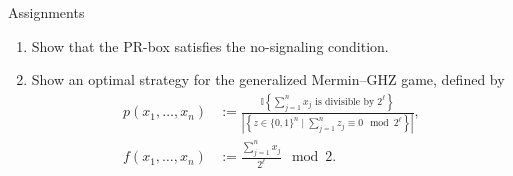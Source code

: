 \documentclass{beamer}
\begin{document}
\begin{frame}{Assignments}
\begin{enumerate}
\setlength{\itemsep}{2em}
\item Show that the PR-box satisfies the no-signaling condition.
\item Show an optimal strategy for the generalized Mermin--GHZ game, defined by
\small
\begin{align*}
p(x_1,\dotsc,x_n) &:= \frac{\mathbb{I}\left\{\sum_{j=1}^n x_j\text{ is divisible by } 2^\ell\right\}}{\left|\left\{z\in\{0,1\}^n\mid \sum_{j=1}^n z_j \equiv 0 \mod 2^\ell\right\}\right|},\\
f(x_1,\dotsc,x_n) &:= \frac{\sum_{j=1}^n x_j}{2^\ell}\mod 2.
\end{align*}
\end{enumerate}
\end{frame}
\end{document}
